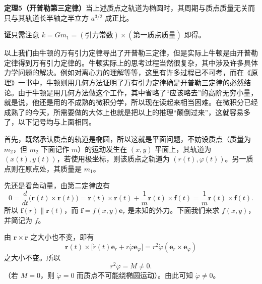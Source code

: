 \noindent\textbf{定理5（开普勒第三定律）}\quad 当上述质点之轨道为椭圆时，其周期与质点质量无关而只与其轨道长半轴之半立方 $a^{3/2}$ 成正比。

\noindent\textbf{证}\quad 只需注意 $k=Gm_1=(\text{引力常数})\times(\text{第一质点质量})$ 即得。

以上我们由牛顿的万有引力定律导出了开普勒三定律，但是实际上牛顿是由开普勒定律得到万有引力定律的。牛顿实际上的思考过程当然很复杂，其中涉及许多具体力学问题的解决。例如对离心力的理解等等，这里有许多过程已不可考，而在《原理》一书中，牛顿则用几何方法证明了万有引力定律确是开普勒三定律的必然结论。由于牛顿是用几何方法做这个工作，其中省略了“应该略去”的高阶无穷小量，就是说，他还是用的不成熟的微积分学，所以现在读起来相当困难。在微积分已经成熟了的今天，所需要做的大体上也就是把以上的推理“颠倒过来”，这就容易多了，以下记号均与上面相同。

首先，既然承认质点的轨道是椭圆，所以这就是平面问题，不妨设质点（质量为 $m_2$，但 $m_2$ 下面记作 $m$）的运动发生在 $(x,y)$ 平面上，其轨道为 $(x(t),y(t))$，若使用极坐标，则该质点之轨道为 $(r(t),\varphi(t))$。另一质点则在原点处，其质量是 $m_1$。

先还是看角动量，由第二定律应有
\[
 0=\frac d{dt}\bigl(\boldsymbol r(t)\times\dot{\boldsymbol r}(t)\bigr)
 =\dot{\boldsymbol r}(t)\times\dot{\boldsymbol r}(t)+\frac1m\boldsymbol r(t)\times\boldsymbol f(t)
 =\frac1m\boldsymbol r(t)\times\boldsymbol f(t).
\]
所以 $\boldsymbol f(r)\parallel\boldsymbol r(t)$，而 $\boldsymbol f=f(x,y)\boldsymbol e_r$ 是未知的外力。下面我们来求 $f(x,y)$，并简记为 $f$。

由 $\boldsymbol r\times\dot{\boldsymbol r}$ 之大小也不变，即有
\[
 \boldsymbol r(t)\times\bigl[\dot r(t)\boldsymbol e_r+r\dot\varphi\boldsymbol e_\varphi\bigr]
 =r^2\dot\varphi(\boldsymbol e_r\times\boldsymbol e_\varphi)
\]
之大小不变。所以
\begin{equation}
 r^2\dot\varphi=M\ne0.
 \tag{25}
\end{equation}
（若 $M=0$，则 $\dot\varphi=0$ 而质点不可能绕椭圆运动）。由此可知 $\dot\varphi\ne0$。


